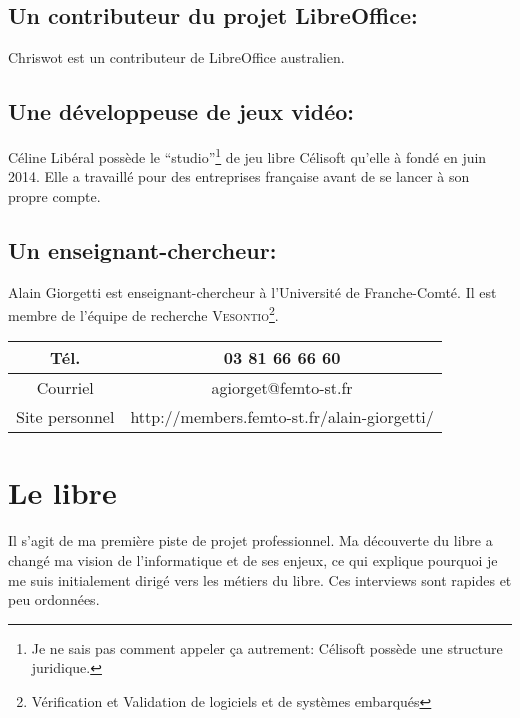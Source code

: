 \documentclass[a4paper,12pt, draft]{report}
\begin{document}
\subsection[Un contributeur du projet LibreOffice]{Un contributeur du projet LibreOffice: }
Chriswot est un contributeur de LibreOffice australien.

\subsection[Une développeuse de jeux vidéo]{Une développeuse de jeux vidéo: }
Céline Libéral possède le ``studio''\footnote{Je ne sais pas comment appeler ça autrement: Célisoft possède une structure juridique.} de jeu libre Célisoft qu'elle à fondé en juin 2014. Elle a travaillé pour des entreprises française avant de se lancer à son propre compte.

\subsection[Un enseignant-chercheur]{Un enseignant-chercheur:  }
Alain Giorgetti est enseignant-chercheur à l'Université de Franche-Comté. Il est membre de l'équipe de recherche \textsc{Vesontio}\footnote{Vérification et Validation de logiciels et de systèmes embarqués}.\\

\begin{tabular}{c|c}

    Tél. & 03 81 66 66 60\\
\hline
    Courriel & agiorget@femto-st.fr\\
\hline
    Site personnel & http://members.femto-st.fr/alain-giorgetti/\\

\end{tabular}

\section{Le libre}
\paragraph{}
Il s'agit de ma première piste de projet professionnel. Ma découverte du libre a changé ma vision de l'informatique et de ses enjeux, ce qui explique pourquoi je me suis initialement dirigé vers les métiers du libre. Ces interviews sont rapides et peu ordonnées.
\end{document}

